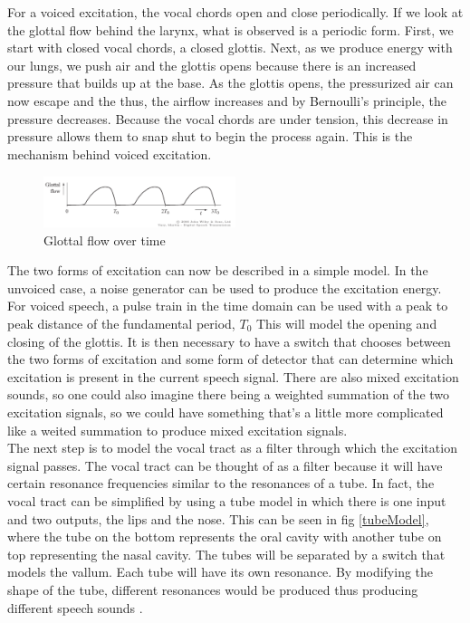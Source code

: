 For a voiced excitation, the vocal chords open and close periodically. If we look at the glottal flow behind the larynx, what is observed is a periodic form. First, we start with closed vocal chords, a closed glottis. Next, as we produce energy with our lungs, we push air and the glottis opens because there is an increased pressure that builds up at the base. As the glottis opens, the pressurized air can now escape and the thus, the airflow increases and by Bernoulli's principle, the pressure decreases. Because the vocal chords are under tension, this decrease in pressure allows them to snap shut to begin the process again. This is the mechanism behind voiced excitation. \\

\begin{figure}
    \includegraphics[width=0.5\textwidth]{Pictures/Chapter1_Lesson3/glottalFlow-eps-converted-to.pdf}
    \caption{Glottal flow over time}
    \label{glotFlow}
\end{figure}

 The two forms of excitation can now be described in a simple model. In the unvoiced case,  a noise generator can be used to produce the excitation energy.  For voiced speech, a pulse train in the time domain can be used with a peak to peak distance of the fundamental period, \begin{math}T_0\end{math} This will model the opening and closing of the glottis.  It is then necessary to have a switch that chooses between the two forms of excitation and some form of detector that can determine which excitation is present in the current speech signal.  There are also mixed excitation sounds, so one could also imagine there being a weighted summation of the two excitation signals, so we could have something that's a little more complicated like a weited summation to produce mixed excitation signals. \\

The next step is to model the vocal tract as a filter through which the excitation signal passes. The vocal tract can be thought of as a filter because it will have certain resonance frequencies similar to the resonances of a tube. In fact, the vocal tract can be simplified by using a tube model in which there is one input and two outputs, the lips and the nose. This can be seen in fig \ref{tubeModel}, where the tube on the bottom represents the oral cavity with another tube on top representing the nasal cavity.  The tubes will be separated by a switch that models the vallum.  Each tube will have its own resonance.  By modifying the shape of the tube, different resonances would be produced thus producing different speech sounds .\\

